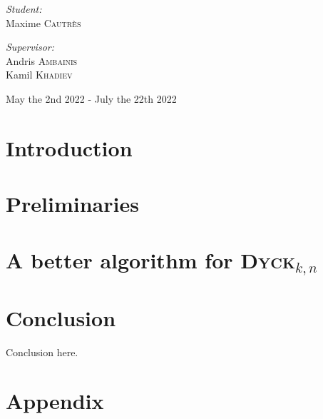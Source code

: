 \documentclass[11pt,a4paper]{article}
\newcommand{\Dyck}[1]{\textsc{Dyck$_{#1}$}}
\theoremstyle{definition}
\theoremstyle{plain}
\theoremstyle{definition}
\begin{document}
\begin{titlepage}
\begin{sffamily}
\begin{center}
            \hspace{-0.8cm}
            \begin{minipage}{0.4\textwidth}
                \begin{flushleft} \large
                    \emph{Student:} \\
                    Maxime \textsc{Cautrès}\\
                \end{flushleft}
            \end{minipage}
            \hspace{3cm}
            \begin{minipage}{0.4\textwidth}
                \begin{flushright} \large
                    \emph{Supervisor:}\\
                    Andris \textsc{Ambainis}\\
                    Kamil \textsc{Khadiev}\\
                \end{flushright}
            \end{minipage}

            \vspace*{0.5cm}
            {\large   May the 2nd 2022 -  July the 22th 2022}
        \end{center}
    \end{sffamily}
\end{titlepage}

\tableofcontents

\newpage

\section{Introduction}



\section{Preliminaries}\label{sec:preli}



\section{A better algorithm for \Dyck{k,n}}



\section{Conclusion}

Conclusion here.




\listoffigures
\listofalgorithms

\newpage

\section{Appendix}


\end{document}
